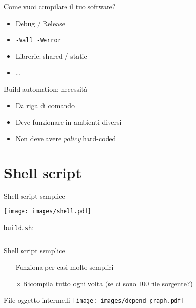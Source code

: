 \documentclass[xetex,table]{beamer}
\begin{document}
\begin{frame}{Come vuoi compilare il tuo software?}
  \begin{itemize}
  \item Debug / Release
  \item \texttt{-Wall -Werror}
  \item Librerie: shared / static
  \item \dots
  \end{itemize}
\end{frame}

\begin{frame}{Build automation: necessità}
  \begin{itemize}
  \item Da riga di comando
  \item Deve funzionare in ambienti diversi
  \item Non deve avere {\em policy} hard-coded
  \end{itemize}
\end{frame}

\section{Shell script}


\begin{frame}[fragile]{Shell script semplice}
  \begin{center}
  \texttt{[image: images/shell.pdf]}
  \end{center}

  \texttt{build.sh}:

  \inputminted[bgcolor=codebackground,frame=single]{shell}{examples/1-shell-1/build.sh}
\end{frame}

\begin{frame}{Shell script semplice}
  \begin{itemize}
  \item[\checkmark] Funziona per casi molto semplici
  \item[$\times$]   Ricompila tutto ogni volta (se ci sono 100 file sorgente?)
  \end{itemize}
\end{frame}

\begin{frame}{File oggetto intermedi}
  \center\texttt{[image: images/depend-graph.pdf]}
\end{frame}
\end{document}

